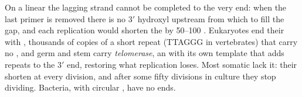 \begin{proposition}\label{prop:b1:replication-mitosis:telomerase}
On a linear  the lagging strand cannot be completed to the
very end: when the last primer is removed there is no $3'$ hydroxyl
upstream from which to fill the gap, and each replication would
shorten the  by \qtyrange{50}{100}{} . Eukaryotes
end their  with \emph{}, thousands of copies of a
short repeat (TTAGGG in vertebrates) that carry no , and germ
 and stem  carry \emph{telomerase}, an  with its own
 template that adds repeats to the $3'$ end, restoring what
replication loses. Most somatic  lack it: their  shorten
at every division, and after some fifty divisions in culture they stop
dividing. Bacteria, with circular , have no ends.
\end{proposition}

